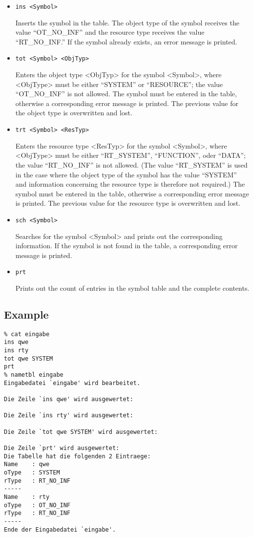 \begin{itemize}

\item {\tt ins <Symbol>}

Inserts the symbol in the table.
The object type of the symbol receives the value ``OT\_NO\_INF''
and the resource type receives the value ``RT\_NO\_INF.''
If the symbol already exists, an error message is printed.

\item {\tt tot <Symbol> <ObjTyp>}

Enters the object type <ObjTyp> for the symbol <Symbol>,
where <ObjType> must be either ``SYSTEM'' or ``RESOURCE'';
the value ``OT\_NO\_INF'' is not allowed.
The symbol must be entered in the table, otherwise a corresponding
error message is printed. 
The previous value for the object type is overwritten and lost.

\item {\tt trt <Symbol> <ResTyp>}

Enters the resource type <ResTyp> for the symbol <Symbol>,
where <ObjType> must be either 
``RT\_SYSTEM'', ``FUNCTION'', oder ``DATA'';
the value ``RT\_NO\_INF'' is not allowed.
(The value ``RT\_SYSTEM'' is used in the case where the object type
of the symbol has the value ``SYSTEM''  and information concerning the
resource type is therefore not required.)
The symbol must be entered in the table, otherwise a corresponding
error message is printed. 
The previous value for the resource type is overwritten and lost.


\item {\tt sch <Symbol>}

Searches for the symbol <Symbol> and prints out the corresponding
information. 
If the symbol is not found in the table, a corresponding error message
is printed. 

\item {\tt prt}

Prints out the count of entries in the symbol table and the complete
contents.

\end{itemize}


\subsection*{Example}
{\small
\begin{verbatim}
% cat eingabe
ins qwe
ins rty
tot qwe SYSTEM
prt
% nametbl eingabe
Eingabedatei `eingabe' wird bearbeitet.

Die Zeile `ins qwe' wird ausgewertet:

Die Zeile `ins rty' wird ausgewertet:

Die Zeile `tot qwe SYSTEM' wird ausgewertet:

Die Zeile `prt' wird ausgewertet:
Die Tabelle hat die folgenden 2 Eintraege:
Name    : qwe
oType   : SYSTEM
rType   : RT_NO_INF
-----
Name    : rty
oType   : OT_NO_INF
rType   : RT_NO_INF
-----
Ende der Eingabedatei `eingabe'.
\end{verbatim}
}


